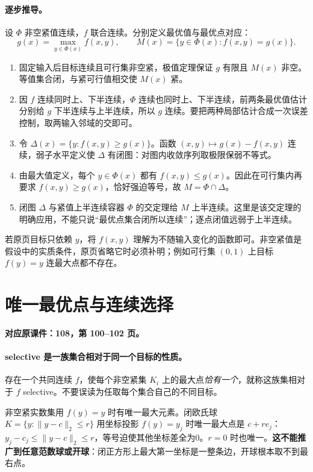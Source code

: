 \paragraph{逐步推导。}
设 $\Phi$ 非空紧值连续，$f$ 联合连续。分别定义最优值与最优点对应：
\[g(x)=\max_{y\in\Phi(x)}f(x,y),\qquad M(x)=\{y\in\Phi(x):f(x,y)=g(x)\}.\]
\begin{enumerate}
\item 固定输入后目标连续且可行集非空紧，极值定理保证 $g$ 有限且 $M(x)$ 非空。等值集合闭，与紧可行值相交使 $M(x)$ 紧。
\item 因 $f$ 连续同时上、下半连续，$\Phi$ 连续也同时上、下半连续，前两条最优值估计分别给 $g$ 下半连续与上半连续，所以 $g$ 连续。要把两种局部估计合成一次误差控制，取两输入邻域的交即可。
\item 令 $\Delta(x)=\{y:f(x,y)\ge g(x)\}$。函数 $(x,y)\mapsto g(x)-f(x,y)$ 连续，弱子水平定义使 $\Delta$ 有闭图：对图内收敛序列取极限保弱不等式。
\item 由最大值定义，每个 $y\in\Phi(x)$ 都有 $f(x,y)\le g(x)$。因此在可行集内再要求 $f(x,y)\ge g(x)$，恰好强迫等号，故 $M=\Phi\cap\Delta$。
\item 闭图 $\Delta$ 与紧值上半连续容器 $\Phi$ 的交定理给 $M$ 上半连续。这里是该交定理的明确应用，不能只说“最优点集合闭所以连续”；逐点闭值远弱于上半连续。
\end{enumerate}
若原页目标只依赖 $y$，将 $f(x,y)$ 理解为不随输入变化的函数即可。非空紧值是假设中的实质条件，原页省略它时必须补明；例如可行集 $(0,1)$ 上目标 $f(y)=y$ 连最大点都不存在。


\clearpage\section{唯一最优点与连续选择}\label{g:108:100}

\textbf{对应原课件：108，第 100--102 页。}


\paragraph{selective 是一族集合相对于同一个目标的性质。}
存在一个共同连续 $f$，使每个非空紧集 $K_i$ 上的最大点\emph{恰有一个}，就称这族集相对于 $f$ selective。不要误读为任取每个集合自己的不同目标。

非空紧实数集用 $f(y)=y$ 时有唯一最大元素。闭欧氏球 $K=\{y:\|y-c\|_2\le r\}$ 用坐标投影 $f(y)=y_j$ 时唯一最大点是 $c+re_j$：$y_j-c_j\le\|y-c\|_2\le r$，等号迫使其他坐标差全为0。$r=0$ 时也唯一。\textbf{这不能推广到任意范数球或开球}：闭正方形上最大第一坐标是一整条边，开球根本取不到最右点。


